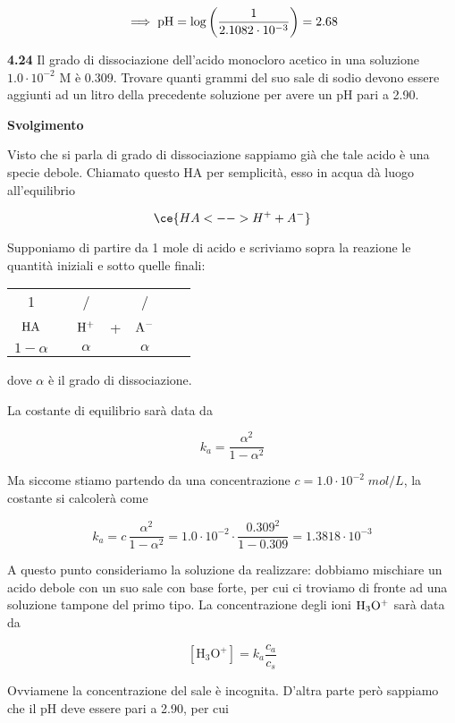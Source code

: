 $$\implies \rm pH=\log{\left(\frac{1}{2.1082 \cdot 10^{-3}}\right)}=2.68$$

\vspace{0.2cm}\textbf{4.24} Il grado di dissociazione dell'acido monocloro acetico in una soluzione $1.0 \cdot 10^{-2}$ M è 0.309. Trovare quanti grammi del suo sale di sodio devono essere aggiunti ad un litro della precedente soluzione per avere un pH pari a 2.90.

\vspace{0.2cm}\large\textbf{Svolgimento}\normalsize

\vspace{0.2cm}Visto che si parla di grado di dissociazione sappiamo già che tale acido è una specie debole. Chiamato questo HA per semplicità, esso in acqua dà luogo all'equilibrio

$$\ce{HA <--> H^+ + A^-}$$

Supponiamo di partire da 1 mole di acido e scriviamo sopra la reazione le quantità iniziali e sotto quelle finali:

\begin{center}
    \begin{tabular}{ccccccc}
        1 & & / & & /\\
        $\rm HA$ & \ce{<-->} & $\rm H^+$ & + & $\rm A^-$\\
        $1- \alpha$ & & $\alpha$ & & $\alpha$\\
    \end{tabular}
\end{center}

dove $\alpha$ è il grado di dissociazione.

La costante di equilibrio sarà data da

$$k_a=\frac{\alpha^2}{1-\alpha^2}$$

Ma siccome stiamo partendo da una concentrazione $c=1.0 \cdot 10^{-2}\;mol/L$, la costante si calcolerà come

$$k_a=c\,\frac{\alpha^2}{1-\alpha^2}
=1.0 \cdot 10^{-2} \cdot \frac{0.309^2}{1-0.309}
=1.3818 \cdot 10^{-3}$$

A questo punto consideriamo la soluzione da realizzare: dobbiamo mischiare un acido debole con un suo sale con base forte, per cui ci troviamo di fronte ad una soluzione tampone del primo tipo. La concentrazione degli ioni $\rm H_3O^+$ sarà data da

$$[\text{H}_3\text{O}^+] = k_a \frac{c_a}{c_s}$$

Ovviamene la concentrazione del sale è incognita. D'altra parte però sappiamo che il pH deve essere pari a 2.90, per cui 

